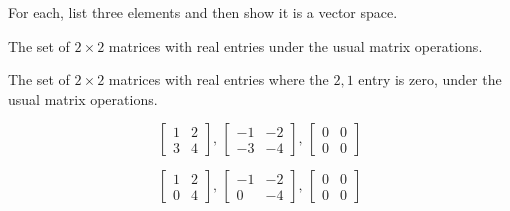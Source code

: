 
\begin{Exercise}[
name={},
title={}, 
difficulty=0,
origin={by Jim Hefferon \cite{JH}}]
For each, list three elements and then show it is a vector space.

\Question The set of \( 2\times 2 \) matrices with real entries under
        the usual matrix operations.

\Question The set of \( 2\times 2 \) matrices with real entries where
        the $2,1$ entry is zero,  under
        the usual matrix operations.


\end{Exercise}

\begin{Answer}
\Question \begin{equation*}
            \begin{bmatrix}
              1  &2  \\
              3  &4
            \end{bmatrix},\,
            \begin{bmatrix}
              -1  &-2  \\
              -3  &-4
            \end{bmatrix},\,
            \begin{bmatrix}
              0  &0  \\
              0  &0
            \end{bmatrix}
          \end{equation*}

\Question \begin{equation*}
            \begin{bmatrix}
              1  &2  \\
              0  &4
            \end{bmatrix},\,
            \begin{bmatrix}
              -1  &-2  \\
              0  &-4
            \end{bmatrix},\,
            \begin{bmatrix}
              0  &0  \\
              0  &0
            \end{bmatrix}
          \end{equation*}


\end{Answer}

